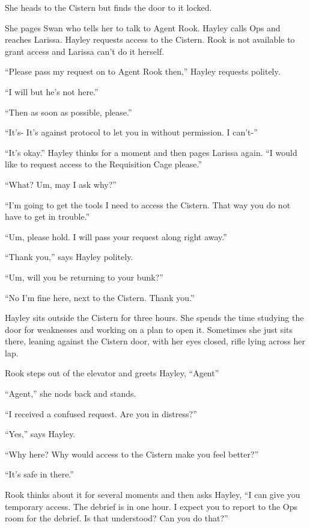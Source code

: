 
She heads to the Cistern but finds the door to it locked.



She pages Swan who tells her to talk to Agent Rook.  Hayley calls Ops and reaches Larissa.  Hayley requests access to the Cistern.  Rook is not available to grant access and Larissa can't do it herself.  

``Please pass my request on to Agent Rook then,'' Hayley requests politely.

``I will but he's not here.''

``Then as soon as possible, please.''

``It's- It's against protocol to let you in without permission.  I can't-''

``It's okay.''  Hayley thinks for a moment and then pages Larissa again.  ``I would like to request access to the Requisition Cage please.''

``What?  Um, may I ask why?''

``I'm going to get the tools I need to access the Cistern.  That way you do not have to get in trouble.''

``Um, please hold.  I will pass your request along right away.''

``Thank you,'' says Hayley politely.

``Um, will you be returning to your bunk?''

``No I'm fine here, next to the Cistern.  Thank you.''



Hayley sits outside the Cistern for three hours.  She spends the time studying the door for weaknesses and working on a plan to open it.  Sometimes she just sits there, leaning against the Cistern door, with her eyes closed, rifle lying across her lap.



Rook steps out of the elevator and greets Hayley, ``Agent''

``Agent,'' she nods back and stands.

``I received a confused request.  Are you in distress?''

``Yes,'' says Hayley.

``Why here?  Why would access to the Cistern make you feel better?''

``It's safe in there.''

Rook thinks about it for several moments and then asks Hayley, ``I can give you temporary access.  The debrief is in one hour.  I expect you to report to the Ops room for the debrief.  Is that understood?  Can you do that?''

